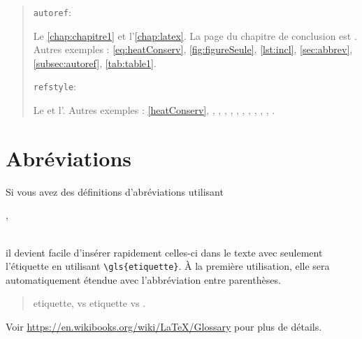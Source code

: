 \begin{quote}
		\texttt{autoref}:
	
	Le \autoref{chap:chapitre1} et l'\autoref{chap:latex}. La page du chapitre de conclusion est . Autres exemples : \autoref{eq:heatConserv}, \autoref{fig:figureSeule}, \autoref{lst:incl}, \autoref{sec:abbrev}, \autoref{subsec:autoref}, \autoref{tab:table1}.
	
	\texttt{refstyle}:
	
	Le  et l'. Autres exemples : \eqref{heatConserv}, , , , , , , , , , , .
\end{quote}

\modeDefaut

\section{Abréviations}
\label{sec:abbrev}

Si vous avez des définitions d'abréviations utilisant\\
\begin{verb}
	,
\end{verb}\\
il devient facile d'insérer rapidement celles-ci dans le texte avec seulement l'étiquette en utilisant \verb|\gls{etiquette}|. À la première utilisation, elle sera automatiquement étendue avec l'abbréviation entre parenthèses.
\begin{quote}
	\gls{etiquette}, vs \gls{etiquette} vs .
\end{quote}

Voir \url{https://en.wikibooks.org/wiki/LaTeX/Glossary} pour plus de détails.
